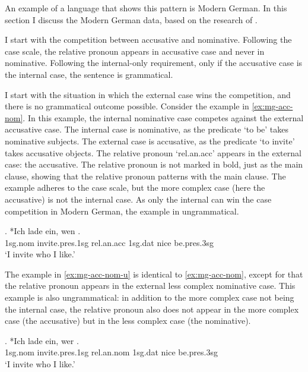 An example of a language that shows this pattern is Modern German. In this section I discuss the Modern German data, based on the research of \citet{vogel2001}.

I start with the competition between accusative and nominative. Following the case scale, the relative pronoun appears in accusative case and never in nominative. Following the internal-only requirement, only if the accusative case is the internal case, the sentence is grammatical.

I start with the situation in which the external case wins the competition, and there is no grammatical outcome possible.
Consider the example in \ref{ex:mg-acc-nom}. In this example, the internal nominative case competes against the external accusative case.
The internal case is nominative, as the predicate  `to be' takes nominative subjects.
The external case is accusative, as the predicate  `to invite' takes accusative objects.
The relative pronoun  `\ac{rel}.\ac{an}.\ac{acc}' appears in the external case: the accusative. The relative pronoun is not marked in bold, just as the main clause, showing that the relative pronoun patterns with the main clause.
The example adheres to the case scale, but the more complex case (here the accusative) is not the internal case. As only the internal can win the case competition in Modern German, the example in ungrammatical.

\exg. *Ich {lade ein}, wen   .\\
 1\ac{sg}.\ac{nom} invite.\ac{pres}.1\ac{sg}\scsub{[acc]} \ac{rel}.\ac{an}.\ac{acc} 1\ac{sg}.\ac{dat} nice be.\ac{pres}.3\ac{sg}\scsub{[nom]}\\
 `I invite who I like.' \label{ex:mg-acc-nom}

The example in \ref{ex:mg-acc-nom-u} is identical to \ref{ex:mg-acc-nom}, except for that the relative pronoun appears in the external less complex nominative case. This example is also ungrammatical: in addition to the more complex case not being the internal case, the relative pronoun also does not appear in the more complex case (the accusative) but in the less complex case (the nominative).

\exg. *Ich {lade ein}, wer   .\\
 1\ac{sg}.\ac{nom} invite.\ac{pres}.1\ac{sg}\scsub{[acc]} \ac{rel}.\ac{an}.\ac{nom} 1\ac{sg}.\ac{dat} nice be.\ac{pres}.3\ac{sg}\scsub{[nom]}\\
 `I invite who I like.' \label{ex:mg-acc-nom-u}

